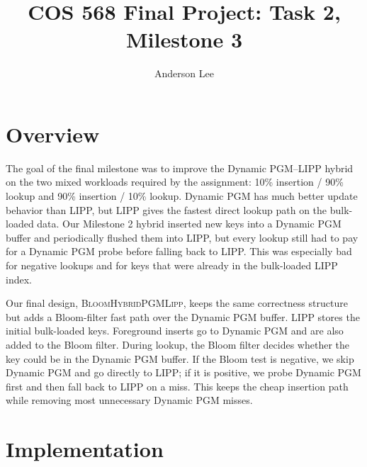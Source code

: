 \documentclass{MITcsail}
\title{COS 568 Final Project: Task 2, Milestone 3}
\author{Anderson Lee}
\begin{document}
\maketitle
\thispagestyle{firstpagestyle}

\section{Overview}

The goal of the final milestone was to improve the Dynamic PGM--LIPP hybrid on
the two mixed workloads required by the assignment: 10\% insertion / 90\%
lookup and 90\% insertion / 10\% lookup. Dynamic PGM has much better update
behavior than LIPP, but LIPP gives the fastest direct lookup path on the
bulk-loaded data. Our Milestone 2 hybrid inserted new keys into a Dynamic PGM
buffer and periodically flushed them into LIPP, but every lookup still had to
pay for a Dynamic PGM probe before falling back to LIPP. This was especially
bad for negative lookups and for keys that were already in the bulk-loaded
LIPP index.

Our final design, \textsc{BloomHybridPGMLipp}, keeps the same correctness
structure but adds a Bloom-filter fast path over the Dynamic PGM buffer. LIPP
stores the initial bulk-loaded keys. Foreground inserts go to Dynamic PGM and
are also added to the Bloom filter. During lookup, the Bloom filter decides
whether the key could be in the Dynamic PGM buffer. If the Bloom test is
negative, we skip Dynamic PGM and go directly to LIPP; if it is positive, we
probe Dynamic PGM first and then fall back to LIPP on a miss. This keeps the
cheap insertion path while removing most unnecessary Dynamic PGM misses.

\section{Implementation}
\end{document}
